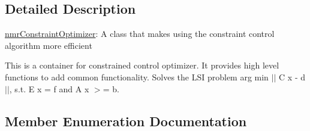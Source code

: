 \subsection{Detailed Description}
\hyperlink{classnmr_constraint_optimizer}{nmr\+Constraint\+Optimizer}\+: A class that makes using the constraint control algorithm more efficient 

This is a container for constrained control optimizer. It provides high level functions to add common functionality. Solves the L\+S\+I problem arg min $\vert$$\vert$ C x -\/ d $\vert$$\vert$, s.\+t. E x = f and A x $>$= b. 

\subsection{Member Enumeration Documentation}
\hypertarget{classnmr_constraint_optimizer_ad46bf972892431d2c0a43a7099aec898}{}
